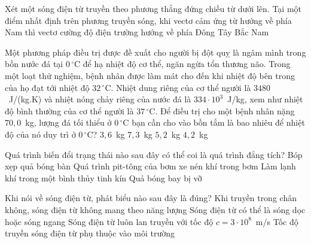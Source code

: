 	\begin{ex}%
		Xét một sóng điện từ truyền theo phương thẳng đứng chiều từ dưới lên. Tại một điểm nhất định trên phương truyền sóng, khi vectơ cảm ứng từ hướng về phía Nam thì vectơ cường độ điện trường hướng về phía
		\choice
		{Đông}
		{\True Tây}
		{Bắc}
		{Nam}
	\end{ex}

	\begin{ex}%
		Một phương pháp điều trị được đề xuất cho người bị đột quỵ là ngâm mình trong bồn nước đá tại $0\,^\circ\text{C}$ để hạ nhiệt độ cơ thể, ngăn ngừa tổn thương não. Trong một loạt thử nghiệm, bệnh nhân được làm mát cho đến khi nhiệt độ bên trong của họ đạt tới nhiệt độ $32\,^\circ\text{C}$. Nhiệt dung riêng của cơ thể người là $3480$~J/(kg.K) và nhiệt nóng chảy riêng của nước đá là $334\cdot 10^3$~J/kg, xem như nhiệt độ bình thường của cơ thể người là $37\,^\circ\text{C}$. Để điều trị cho một bệnh nhân nặng $70{,}0$~kg, lượng đá tối thiểu ở $0\,^\circ\text{C}$ bạn cần cho vào bồn tắm là bao nhiêu để nhiệt độ của nó duy trì ở $0\,^\circ\text{C}$?
		\choice
		{\True $3{,}6$~kg}
		{$7{,}3$~kg}
		{$5{,}2$~kg}
		{$4{,}2$~kg}
	\end{ex}

	\begin{ex}%
		Quá trình biến đổi trạng thái nào sau đây có thể coi là quá trình đẳng tích?
		\choice
		{Bóp xẹp quả bóng bàn}
		{Quá trình pit-tông của bơm xe nén khí trong bơm}
		{\True Làm lạnh khí trong một bình thủy tinh kín}
		{Quả bóng bay bị vỡ}
	\end{ex}

	\begin{ex}%
		Khi nói về sóng điện từ, phát biểu nào sau đây là đúng?
		\choice
		{Khi truyền trong chân không, sóng điện từ không mang theo năng lượng}
		{Sóng điện từ có thể là sóng dọc hoặc sóng ngang}
		{Sóng điện từ luôn lan truyền với tốc độ $c=3\cdot 10^8$~m/s}
		{\True Tốc độ truyền sóng điện từ phụ thuộc vào môi trường}
	\end{ex}

